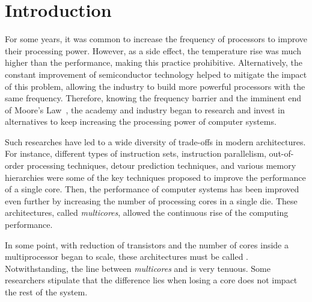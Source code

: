 \chapter{Introduction}
\label{ch.intro}

	For some years, it was common to increase the frequency of processors
	to improve their processing power.
	However, as a side effect, the temperature rise was much higher than the
	performance, making this practice prohibitive.
	Alternatively, the constant improvement of semiconductor technology helped
	to mitigate the impact of this problem, allowing the industry to build
	more powerful processors with the same frequency.
	Therefore, knowing the frequency barrier and the imminent end of Moore's Law~\cite{moore:1965},
	the academy and industry began to research and invest in alternatives
	to keep increasing the processing power of computer systems.

	Such researches have led to a wide diversity of trade-offs in modern architectures.
	For instance, different types of instruction sets, instruction parallelism,
	out-of-order processing techniques, detour prediction techniques, and various
	memory hierarchies were some of the key techniques proposed to improve the
	performance of a single core.
	Then, the performance of computer systems has been improved even further by
	increasing the number of processing cores in a single die.
	These architectures, called \textit{multicores}, allowed the continuous
	rise of the computing performance.

	In some point, with reduction of transistors and the number of cores inside
	a multiprocessor began to scale, these architectures must be called \manycores.
	Notwithstanding, the line between \textit{multicores} and \manycores is very tenuous.
	Some researchers stipulate that the difference lies when losing a core
	does not impact the rest of the system.

